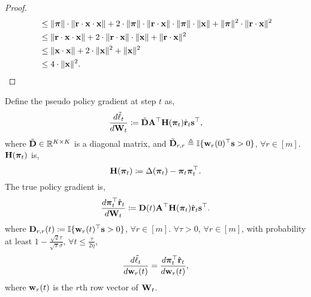 \begin{proof}
\begin{equation*}
\begin{split}
    &\le \| {\boldsymbol{\pi}} \| \cdot \| {\mathbf{r}} \cdot {\mathbf{x}} \cdot {\mathbf{x}} \| + 2 \cdot \| {\boldsymbol{\pi}} \| \cdot \| {\mathbf{r}} \cdot {\mathbf{x}} \| \cdot \| {\boldsymbol{\pi}} \| \cdot \| {\mathbf{x}} \| + \| {\boldsymbol{\pi}} \|^2 \cdot \| {\mathbf{r}} \cdot {\mathbf{x}} \|^2 \\
    &\le \| {\mathbf{r}} \cdot {\mathbf{x}} \cdot {\mathbf{x}} \| + 2 \cdot \| {\mathbf{r}} \cdot {\mathbf{x}} \| \cdot \| {\mathbf{x}} \| + \| {\mathbf{r}} \cdot {\mathbf{x}} \|^2 \\
    &\le \| {\mathbf{x}} \cdot {\mathbf{x}} \| + 2 \cdot \| {\mathbf{x}} \|^2 + \| {\mathbf{x}} \|^2 \\
    &\le 4 \cdot \| {\mathbf{x}} \|^2. \qedhere
\end{split}
\end{equation*}
\end{proof}

\begin{lem}
\label{lem:gradient_coupling}
	Define the pseudo policy gradient at step $t$ as,
\begin{equation*}
\begin{split}
	\frac{d \tilde{\ell}_t}{d {\mathbf{W}}_t} \coloneqq \tilde{{\mathbf{D}}} {\mathbf{A}}^\top {\mathbf{H}}( {\boldsymbol{\pi}}_t ) \hat{{\mathbf{r}}}_t {\mathbf{s}}^\top,
\end{split}
\end{equation*}
where $\tilde{{\mathbf{D}}} \in {\mathbb{R}}^{K \times K}$ is a diagonal matrix, and  $\tilde{{\mathbf{D}}}_{r,r} \triangleq {\mathbb{I}}\{ {\mathbf{w}}_r(0)^\top {\mathbf{s}} > 0 \}$, $\forall r \in [m]$. ${\mathbf{H}}( {\boldsymbol{\pi}}_t )$ is,
\begin{equation*}
    {\mathbf{H}}( {\boldsymbol{\pi}}_t ) \coloneqq \Delta( {\boldsymbol{\pi}}_t ) - {\boldsymbol{\pi}}_t {\boldsymbol{\pi}}_t^\top.
\end{equation*}
The true policy gradient is,
\begin{equation*}
\begin{split}
    \frac{d {\boldsymbol{\pi}}_t^\top \hat{{\mathbf{r}}}_t}{d {\mathbf{W}}_t} \coloneqq  {\mathbf{D}}(t) {\mathbf{A}}^\top {\mathbf{H}}( {\boldsymbol{\pi}}_t ) \hat{{\mathbf{r}}}_t {\mathbf{s}}^\top.
\end{split}
\end{equation*}
where ${\mathbf{D}}_{r,r}(t) \coloneqq {\mathbb{I}}\{ {\mathbf{w}}_r(t)^\top {\mathbf{s}} > 0 \}$, $\forall r \in [m]$. $\forall \tau > 0$, $\forall r \in [m]$, with probability at least $1 - \frac{\sqrt{2}\tau}{\sqrt{\pi}\sigma}$, $\forall t \le \frac{\tau}{ 2 \eta }$,
\begin{equation*}
	\frac{d\tilde{\ell}_t}{d {\mathbf{w}}_r(t)} = \frac{d {\boldsymbol{\pi}}_t^\top \hat{{\mathbf{r}}}_t}{d {\mathbf{w}}_r(t)},
\end{equation*}
where ${\mathbf{w}}_r(t)$ is the $r$th row vector of ${\mathbf{W}}_t$.
\end{lem}
